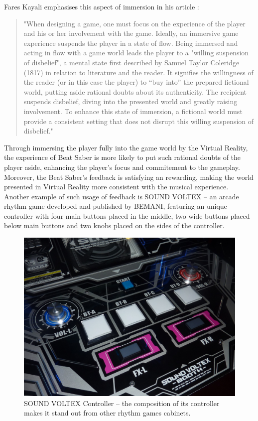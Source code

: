 Fares Kayali emphasises this aspect of immersion in his article \cite{flowbeatsaber}:
\begin{quote}
    \singlespacing
    "When designing a game, one must focus on the experience of the player and his or her involvement with the game. Ideally, an immersive game experience suspends the player in a state of flow. Being immersed and acting in flow with a game world leads the player to a "willing suspension of disbelief", a mental state first described by Samuel Taylor Coleridge (1817) in relation to literature and the reader. It signifies the willingness of the reader (or in this case the player) to “buy into” the prepared fictional world, putting aside rational doubts about its authenticity. The recipient suspends disbelief, diving into the presented world and greatly raising involvement. To enhance this state of immersion, a fictional world must provide a consistent setting that does not disrupt this willing suspension of disbelief."
    \singlespacing
\end{quote}
Through immersing the player fully into the game world by the Virtual Reality, the experience of Beat Saber is more likely to put such rational doubts of the player aside, enhancing the player's focus and commitement to the gameplay. Moreover, the Beat Saber's feedback is satisfying an rewarding, making the world presented in Virtual Reality more consistent with the musical experience.
\singlespacing
Another example of such usage of feedback is SOUND VOLTEX -- an arcade rhythm game developed and published by BEMANI, featuring an unique controller with four main buttons placed in the middle, two wide buttons placed below main buttons and two knobs placed on the sides of the controller.

\begin{figure}[h]
    \centering\includegraphics[scale=0.5]{obrazki/sdvxcontroller.jpeg}
    \caption{SOUND VOLTEX Controller -- the composition of its controller makes it stand out from other rhythm games cabinets.\cite{sdvxcontroller}}
    \label{fig:sdvx}
\end{figure}

